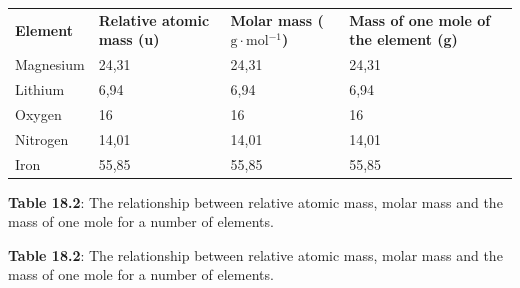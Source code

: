           \begin{table}[H]
        \begin{center}
      \label{m38717*uid11}
    \noindent
      \tablelasttail{}
      \begin{xtabular}[t]{|l|l|l|l|}\hline
                \textbf{Element}
               &
                \textbf{Relative atomic mass (u)}
               &
                \textbf{Molar mass ($\mathrm{g}\ensuremath{\cdot}\mathrm{mol}{}^{-1}$)}
               &
                \textbf{Mass of one mole of the element (g)}
     \tabularnewline{}
        Magnesium &
        24,31 &
        24,31 &
        24,31%
     \tabularnewline{}
        Lithium &
        6,94 &
        6,94 &
        6,94%
     \tabularnewline{}
        Oxygen &
        16 &
        16 &
        16%
     \tabularnewline{}
        Nitrogen &
        14,01 &
        14,01 &
        14,01%
     \tabularnewline{}
        Iron &
        55,85 &
        55,85 &
        55,85%
     \tabularnewline{}
    \end{xtabular}
      \end{center}
    \begin{center}{\small\bfseries Table 18.2}: The relationship between relative atomic mass, molar mass and the mass of one mole for a number of elements.\end{center}
    \begin{caption}{\small\bfseries Table 18.2}: The relationship between relative atomic mass, molar mass and the mass of one mole for a number of elements.\end{caption}
\end{table}
